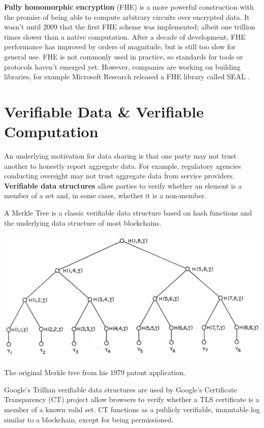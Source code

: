 \documentclass[nobib]{tufte-handout}
\begin{document}
\textbf{Fully homomorphic encryption} (FHE) is a more powerful construction with
the promise of being able to compute arbitrary circuits over encrypted data. It
wasn't until 2009 \cite{DBLP:conf/stoc/Gentry09} that the first FHE scheme was
implemented; albeit one trillion times slower than a native computation. After a
decade of development, FHE performance has improved by orders of magnitude, but
is still too slow for general use. FHE is not commonly used in practice, so
standards for tools or protocols haven't emerged yet. However, companies
are working on building libraries, for example Microsoft Research released a FHE
library called SEAL \cite{sealcrypto}.

\section{Verifiable Data \& Verifiable Computation}
\label{verifiable}

An underlying motivation for data sharing is that one party may not trust
another to honestly report aggregate data. For example, regulatory agencies
conducting oversight may not trust aggregate data from service providers.
\textbf{Verifiable data structures} allow parties to verify whether an element
is a member of a set and, in some cases, whether it is a non-member.

A Merkle Tree \cite{merkle1979} is a classic verifiable data structure based on
hash functions and the underlying data structure of most blockchains.

\begin{marginfigure} \includegraphics[width=\linewidth]{merkle} \caption{The
original Merkle tree from his 1979 patent application.} \label{fig:merkle}
\end{marginfigure}

Google’s Trillian \cite{google-trillian} verifiable data structures are used by
Google's Certificate Transparency (CT) project allow browsers to verify whether
a TLS certificate is a member of a known valid set. CT functions as a publicly
verifiable, immutable log similar to a blockchain, except for being
permissioned.
\end{document}
